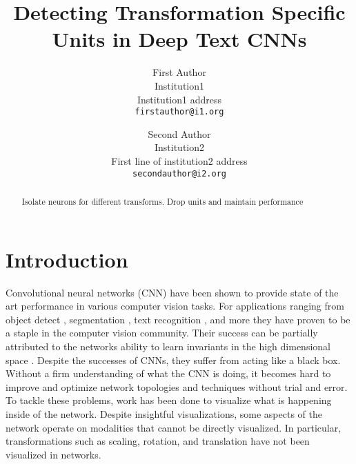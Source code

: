 \documentclass[10pt,twocolumn,letterpaper]{article}
\begin{document}
\title{Detecting Transformation Specific Units in Deep Text CNNs}

\author{First Author\\
Institution1\\
Institution1 address\\
{\tt\small firstauthor@i1.org}
\and
Second Author\\
Institution2\\
First line of institution2 address\\
{\tt\small secondauthor@i2.org}
}

\maketitle

\begin{abstract}
   Isolate neurons for different transforms.
   Drop units and maintain performance
\end{abstract}

\section{Introduction}
Convolutional neural networks (CNN) have been shown to provide state of the art performance in various computer vision tasks.  For applications ranging from object detect \cite{}, segmentation \cite{}, text recognition \cite{}, and more they have proven to be a staple in the computer vision community. Their success can be partially attributed to the networks ability to learn invariants in the high dimensional space \cite{}. Despite the successes of CNNs, they suffer from acting like a black box. Without a firm understanding of what the CNN is doing, it becomes hard to improve and optimize network topologies and techniques without trial and error. To tackle these problems, work has been done to visualize what is happening inside of the network. Despite insightful visualizations, some aspects of the network operate on modalities that cannot be directly visualized. In particular, transformations such as scaling, rotation, and translation have not been visualized in networks. 
\end{document}
